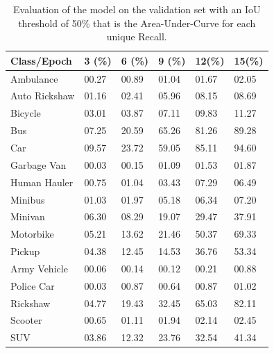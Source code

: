 \begin{table}[!h]
  \centering
  \caption[Evaluation of the model]{Evaluation of the model on the validation set with an IoU threshold of 50\% that is the 
Area-Under-Curve for each unique Recall. }
  \label{tab:class-ap}
  {\renewcommand{\arraystretch}{1.1}
    \begin{tabular}{p{4.3cm} p{1cm} p{1cm} p{1cm} p{1cm} p{1cm}}
          \toprule
          Class/Epoch                       & 3 (\%) & 6 (\%) & 9 (\%) & 12(\%)  & 15(\%) \\
          \hline
          Ambulance                   & 00.27    &  00.89 & 01.04  & 01.67   & 02.05  \\
          Auto Rickshaw               & 01.16    &  02.41 & 05.96  & 08.15   & 08.69  \\
          Bicycle                     & 03.01    &  03.87 & 07.11  & 09.83   & 11.27  \\
          Bus                         & 07.25    &  20.59 & 65.26  & 81.26   & 89.28  \\
          Car                         & 09.57    &  23.72 & 59.05  & 85.11   & 94.60  \\
          Garbage Van                 & 00.03    &  00.15 & 01.09  & 01.53   & 01.87  \\
          Human Hauler                & 00.75    &  01.04 & 03.43  & 07.29   & 06.49  \\
          Minibus                     & 01.03    &  01.97 & 05.18  & 06.34   & 07.20  \\
          Minivan                     & 06.30    &  08.29 & 19.07  & 29.47   & 37.91  \\
          Motorbike                   & 05.21    &  13.62 & 21.46  & 50.37   & 69.33  \\
          Pickup                      & 04.38    &  12.45 & 14.53  & 36.76   & 53.34  \\
          Army Vehicle                & 00.06    &  00.14 & 00.12  & 00.21   & 00.88  \\
          Police Car                  & 00.03    &  00.87 & 00.64  & 00.87   & 01.02  \\
          Rickshaw                    & 04.77    &  19.43 & 32.45  & 65.03   & 82.11  \\
          Scooter                     & 00.65    &  01.11 & 01.94  & 02.14   & 02.45  \\
          SUV                         & 03.86    &  12.32 & 23.76  & 32.54   & 41.34  \\

\end{tabular}}
\end{table}
